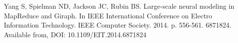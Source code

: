 

\begin{cvpubs}

  \cvpub
    {Yang S, Spielman ND, Jackson JC, Rubin BS. Large-scale neural
    modeling in MapReduce and Giraph. In IEEE International Conference
    on Electro Information Technology. IEEE Computer
    Society. 2014. p. 556-561. 6871824. Available from, DOI:
    10.1109/EIT.2014.6871824}

\end{cvpubs}
